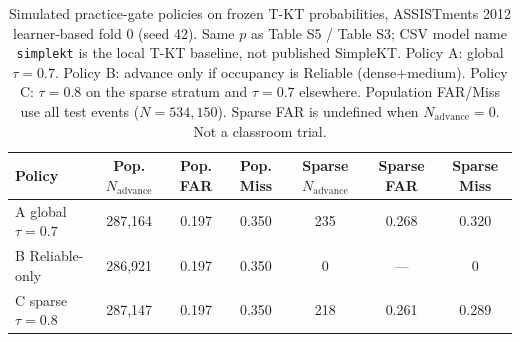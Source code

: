 \begin{table}[htbp]
\caption{Simulated practice-gate policies on frozen T-KT probabilities, ASSISTments 2012 learner-based fold 0 (seed 42). Same $p$ as Table S5 / Table S3; CSV model name \texttt{simplekt} is the local T-KT baseline, not published SimpleKT. Policy A: global $\tau=0.7$. Policy B: advance only if occupancy is Reliable (dense+medium). Policy C: $\tau=0.8$ on the sparse stratum and $\tau=0.7$ elsewhere. Population FAR/Miss use all test events ($N=534{,}150$). Sparse FAR is undefined when $N_{\mathrm{advance}}=0$. Not a classroom trial.}
\label{tab:s4_occupancy_policies}
\centering
\small
\begin{tabular}{lcccccc}
\toprule
Policy & Pop. $N_{\mathrm{advance}}$ & Pop. FAR & Pop. Miss & Sparse $N_{\mathrm{advance}}$ & Sparse FAR & Sparse Miss \\
\midrule
A global $\tau=0.7$ & 287{,}164 & 0.197 & 0.350 & 235 & 0.268 & 0.320 \\
B Reliable-only & 286{,}921 & 0.197 & 0.350 & 0 & --- & 0 \\
C sparse $\tau=0.8$ & 287{,}147 & 0.197 & 0.350 & 218 & 0.261 & 0.289 \\
\bottomrule
\end{tabular}
\end{table}

